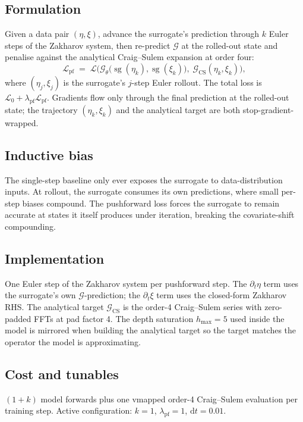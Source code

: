 \documentclass[11pt,letterpaper]{article}
\newcommand{\Gop}{\mathcal{G}}
\newcommand{\sgrad}{\operatorname{sg}}
\begin{document}
\subsection{Formulation}
Given a data pair $(\eta,\xi)$, advance the surrogate's prediction
through $k$ Euler steps of the Zakharov system, then re-predict $\Gop$ at
the rolled-out state and penalise against the analytical Craig--Sulem
expansion at order four:
\[
  \mathcal{L}_{\mathrm{pf}}
  \;=\; \mathcal{L}\!\Big(
     \Gop_\theta\!\big(\sgrad(\eta_{k}), \sgrad(\xi_{k})\big),\;
     \Gop_{\mathrm{CS}}(\eta_{k}, \xi_{k})
  \Big),
\]
where $(\eta_{j},\xi_{j})$ is the surrogate's $j$-step Euler rollout. The
total loss is $\mathcal{L}_{0} + \lambda_{\mathrm{pf}}\mathcal{L}_{\mathrm{pf}}$.
Gradients flow only through the final prediction at the rolled-out state;
the trajectory $(\eta_{k},\xi_{k})$ and the analytical target are both
stop-gradient-wrapped.

\subsection{Inductive bias}
The single-step baseline only ever exposes the surrogate to
data-distribution inputs. At rollout, the surrogate consumes its own
predictions, where small per-step biases compound. The pushforward loss
forces the surrogate to remain accurate at states it itself produces
under iteration, breaking the covariate-shift compounding.

\subsection{Implementation}
One Euler step of the Zakharov system per pushforward step. The
$\partial_{t}\eta$ term uses the surrogate's own $\Gop$-prediction; the
$\partial_{t}\xi$ term uses the closed-form Zakharov RHS. The analytical
target $\Gop_{\mathrm{CS}}$ is the order-4 Craig--Sulem series with
zero-padded FFTs at pad factor 4. The depth saturation $h_{\max} = 5$
used inside the model is mirrored when building the analytical target so
the target matches the operator the model is approximating.

\subsection{Cost and tunables}
$(1+k)$ model forwards plus one vmapped order-4 Craig--Sulem evaluation
per training step. Active configuration: $k=1$, $\lambda_{\mathrm{pf}}=1$,
$\mathrm{d}t=0.01$.
\end{document}
